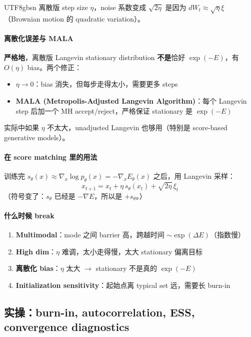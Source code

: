 \documentclass[11pt]{article}
\begin{document}
\begin{CJK}{UTF8}{gbsn}
离散版 step size $\eta$，noise 系数变成 $\sqrt{2\eta}$ 是因为 $dW_t \approx \sqrt{\eta} \xi$（Brownian motion 的 quadratic variation）。

\paragraph{离散化误差与 MALA}

\textbf{严格地}，离散版 Langevin stationary distribution \textbf{不是}恰好 $\exp(-E)$，有 $O(\eta)$ bias。两个修正：
\begin{itemize}[nosep]
  \item $\eta \to 0$：bias 消失，但每步走得太小，需要更多 steps
  \item \textbf{MALA (Metropolis-Adjusted Langevin Algorithm)}：每个 Langevin step 后加一个 MH accept/reject，严格保证 stationary 是 $\exp(-E)$
\end{itemize}
实际中如果 $\eta$ 不太大，unadjusted Langevin 也够用（特别是 score-based generative models）。

\paragraph{在 score matching 里的用法}

训练完 $s_\theta(x) \approx \nabla_x \log p_\theta(x) = -\nabla_x E_\theta(x)$ 之后，用 Langevin 采样：
\[
x_{t+1} = x_t + \eta \, s_\theta(x_t) + \sqrt{2\eta} \, \xi_t
\]
（符号变了：$s_\theta$ 已经是 $-\nabla E$，所以是 $+s_\theta$。）

\paragraph{什么时候 break}

\begin{enumerate}[nosep]
  \item \textbf{Multimodal}：mode 之间 barrier 高，跨越时间 $\sim \exp(\Delta E)$（指数慢）
  \item \textbf{High dim}：$\eta$ 难调，太小走得慢，太大 stationary 偏离目标
  \item \textbf{离散化 bias}：$\eta$ 太大 $\to$ stationary 不是真的 $\exp(-E)$
  \item \textbf{Initialization sensitivity}：起始点离 typical set 远，需要长 burn-in
\end{enumerate}

\subsection{实操：burn-in, autocorrelation, ESS, convergence diagnostics}


\end{CJK}
\end{document}

